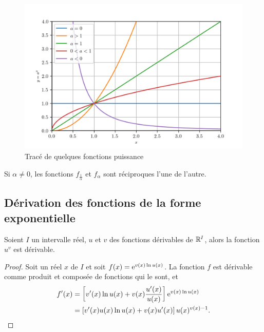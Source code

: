       \begin{figure}
        \centering
        \includegraphics[scale = 1.0]{puiss.png}
        \caption{Tracé de quelques fonctions puissance}\label{figtracepuissance}
      \end{figure}

      Si \(\alpha \neq 0\), les fonctions \(f_{\frac{1}{\alpha}}\) et 
      \(f_\alpha\) sont réciproques l'une de l'autre.

      \subsection{Dérivation des fonctions de la forme exponentielle}\label{subsec:chap1-derivationdesfonctionsdelaformeexponentielle}

      \begin{prop}
        Soient \(I\) un intervalle réel, \(u\) et \(v\) des fonctions dérivables 
        de \(\mathbb{R}^{I}\), alors la fonction \(u^v\) est dérivable.
      \end{prop}
      \begin{proof}
        Soit un réel \(x\) de \(I\) et soit \(f(x) = \operatorname{e}^{v(x) \ln u(x)}\).  La 
        fonction \(f\) est dérivable comme produit et composée de fonctions qui 
        le sont, et
        \begin{align*}
          f'(x) & = \left[ v'(x) \ln u(x) + v(x) \frac{u'(x)}{u(x)} 
          \right]\operatorname{e}^{v(x) \ln u(x)} \\
                &= \left[v'(x)u(x)\ln u(x) + v(x) u'(x) \right]u(x)^{v(x)-1}.
          \end{align*}
        \end{proof}

